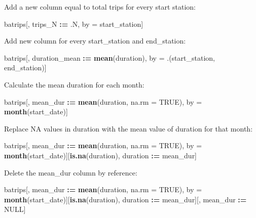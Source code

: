 \documentclass[]{book}
\newenvironment{Shaded}{\begin{snugshade}}{\end{snugshade}}
\newcommand{\DataTypeTok}[1]{\textcolor[rgb]{0.13,0.29,0.53}{#1}}
\newcommand{\ErrorTok}[1]{\textcolor[rgb]{0.64,0.00,0.00}{\textbf{#1}}}
\newcommand{\KeywordTok}[1]{\textcolor[rgb]{0.13,0.29,0.53}{\textbf{#1}}}
\newcommand{\NormalTok}[1]{#1}
\newcommand{\OperatorTok}[1]{\textcolor[rgb]{0.81,0.36,0.00}{\textbf{#1}}}
\newcommand{\OtherTok}[1]{\textcolor[rgb]{0.56,0.35,0.01}{#1}}
\newcommand{\StringTok}[1]{\textcolor[rgb]{0.31,0.60,0.02}{#1}}
\begin{document}
Add a new column equal to total trips for every start station:

\begin{Shaded}
\begin{Highlighting}[]
\NormalTok{batrips[, trips_N }\OperatorTok{:}\ErrorTok{=}\StringTok{ }\NormalTok{.N, by =}\StringTok{ }\NormalTok{start_station]}
\end{Highlighting}
\end{Shaded}

Add new column for every start\_station and end\_station:

\begin{Shaded}
\begin{Highlighting}[]
\NormalTok{batrips[, duration_mean }\OperatorTok{:}\ErrorTok{=}\StringTok{ }\KeywordTok{mean}\NormalTok{(duration), by =}\StringTok{ }\NormalTok{.(start_station, end_station)]}
\end{Highlighting}
\end{Shaded}

Calculate the mean duration for each month:

\begin{Shaded}
\begin{Highlighting}[]
\NormalTok{batrips[, mean_dur }\OperatorTok{:}\ErrorTok{=}\StringTok{ }\KeywordTok{mean}\NormalTok{(duration, }\DataTypeTok{na.rm =} \OtherTok{TRUE}\NormalTok{), }
\NormalTok{            by =}\StringTok{ }\KeywordTok{month}\NormalTok{(start_date)]}
\end{Highlighting}
\end{Shaded}

Replace NA values in duration with the mean value of duration for that month:

\begin{Shaded}
\begin{Highlighting}[]
\NormalTok{batrips[, mean_dur }\OperatorTok{:}\ErrorTok{=}\StringTok{ }\KeywordTok{mean}\NormalTok{(duration, }\DataTypeTok{na.rm =} \OtherTok{TRUE}\NormalTok{), }
\NormalTok{            by =}\StringTok{ }\KeywordTok{month}\NormalTok{(start_date)][}\KeywordTok{is.na}\NormalTok{(duration), }
\NormalTok{                                    duration }\OperatorTok{:}\ErrorTok{=}\StringTok{ }\NormalTok{mean_dur]}
\end{Highlighting}
\end{Shaded}

Delete the mean\_dur column by reference:

\begin{Shaded}
\begin{Highlighting}[]
\NormalTok{batrips[, mean_dur }\OperatorTok{:}\ErrorTok{=}\StringTok{ }\KeywordTok{mean}\NormalTok{(duration, }\DataTypeTok{na.rm =} \OtherTok{TRUE}\NormalTok{), }
\NormalTok{            by =}\StringTok{ }\KeywordTok{month}\NormalTok{(start_date)][}\KeywordTok{is.na}\NormalTok{(duration), }
\NormalTok{                                    duration }\OperatorTok{:}\ErrorTok{=}\StringTok{ }\NormalTok{mean_dur][, mean_dur }\OperatorTok{:}\ErrorTok{=}\StringTok{ }\OtherTok{NULL}\NormalTok{]}
\end{Highlighting}
\end{Shaded}
\end{document}
